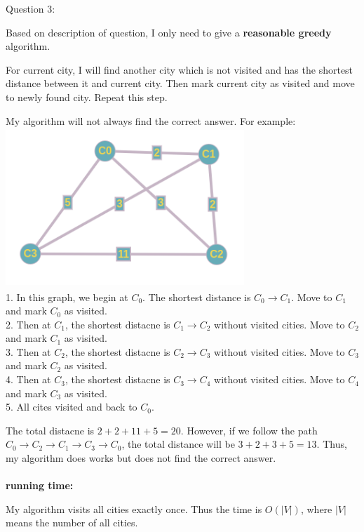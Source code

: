 \documentclass[12pt]{article}
\begin{document}
\pagebreak
\noindent
\large Question 3: \vspace{5mm} \par
\normalsize 
\setlength{\baselineskip}{8mm}
Based on description of question, I only need to give a \textbf{reasonable greedy} algorithm. \par
For current city, I will find another city which is not visited and has the shortest distance between it and current city.
Then mark current city as visited and move to newly found city.
Repeat this step. \par
My algorithm will not always find the correct answer. For example: \\
\includegraphics[width=9cm, height=6cm]{question3image} \\
1. In this graph, we begin at $C_0$. The shortest distance is $C_0 \rightarrow C_1$. Move to $C_1$ and mark $C_0$ as visited. \\
2. Then at $C_1$, the shortest distacne is $C_1 \rightarrow C_2$ without visited cities. Move to $C_2$ and mark $C_1$ as visited. \\
3. Then at $C_2$, the shortest distacne is $C_2 \rightarrow C_3$ without visited cities. Move to $C_3$ and mark $C_2$ as visited. \\
4. Then at $C_3$, the shortest distacne is $C_3 \rightarrow C_4$ without visited cities. Move to $C_4$ and mark $C_3$ as visited. \\
5. All cites visited and back to $C_0$. \par
The total distacne is $2+2+11+5 = 20$.
However, if we follow the path $C_0 \rightarrow C_2 \rightarrow C_1 \rightarrow C_3 \rightarrow C_0$, the total distance will be $3+2+3+5=13$.
Thus, my algorithm does works but does not find the correct answer. \\
\noindent \\
\textbf{running time:} \par
My algorithm visits all cities exactly once. Thus the time is $O(|V|)$, where $|V|$ means the number of all cities.
\end{document}
